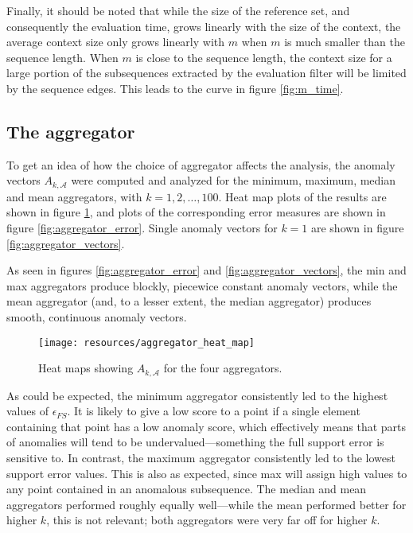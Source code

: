 Finally, it should be noted that while the size of the reference set, and consequently the evaluation time, grows linearly with the size of the context, the average context size only grows linearly with $m$ when $m$ is much smaller than the sequence length. When $m$ is close to the sequence length, the context size for a large portion of the subsequences extracted by the evaluation filter will be limited by the sequence edges. This leads to the curve in figure \ref{fig:m_time}.

\clearpage

\subsection{The aggregator}
\FloatBarrier
\label{sect:A}

To get an idea of how the choice of aggregator affects the analysis, the anomaly vectors $A_{k, \mathcal{A}}$ were computed and analyzed for the minimum, maximum, median and mean aggregators, with $k = 1,2,\dots,100$. Heat map plots of the results are shown in figure \ref{fig:aggregator_heat_map}, and plots of the corresponding error measures are shown in figure \ref{fig:aggregator_error}. Single anomaly vectors for $k=1$ are shown in figure \ref{fig:aggregator_vectors}.

As seen in figures \ref{fig:aggregator_error} and \ref{fig:aggregator_vectors}, the min and max aggregators produce blockly, piecewice constant anomaly vectors, while the mean aggregator (and, to a lesser extent, the median aggregator) produces smooth, continuous anomaly vectors.

\begin{figure}[!ht]
    \vspace{-20pt}
    \begin{center}
        \texttt{[image: resources/aggregator\_heat\_map]}
    \end{center}
    \vspace{-10pt}
    \caption{\small{Heat maps showing $A_{k, \mathcal{A}}$ for the four aggregators.}}
    \label{fig:aggregator_heat_map}
    \vspace{-15pt}
\end{figure}

As could be expected, the minimum aggregator consistently led to the highest values of $\epsilon_{FS}$. It is likely to give a low score to a point if a single element containing that point has a low anomaly score, which effectively means that parts of anomalies will tend to be undervalued---something the full support error is sensitive to. In contrast, the maximum aggregator consistently led to the lowest support error values. This is also as expected, since max will assign high values to any point contained in an anomalous subsequence. The median and mean aggregators performed roughly equally well---while the mean performed better for higher $k$, this is not relevant; both aggregators were very far off for higher $k$.

